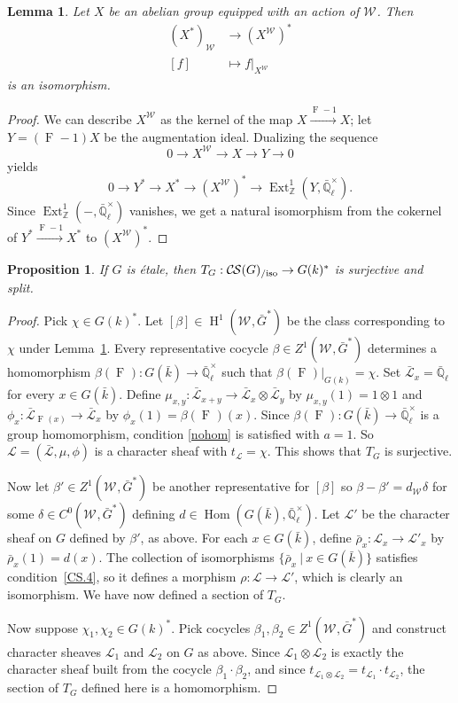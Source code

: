 \documentclass[10pt]{amsart}
\theoremstyle{plain}
\newtheorem{proposition}[theorem]{Proposition}
\newtheorem{lemma}[theorem]{Lemma}
\theoremstyle{definition}
\theoremstyle{remark}
\newcommand{\ZZ}{{\mathbb{Z}}}
\newcommand{\EE}{\mathbb{\bar Q}_\ell}
\newcommand{\bFq}{\bar{k}}
\newcommand{\Fq}{k}
\newcommand{\EEx}{\EE^\times}
\newcommand{\Weil}[1]{\mathcal{W}_{#1}}
\newcommand{\Frob}[1]{\operatorname{F}_{#1}}
\DeclareMathOperator{\Hom}{Hom}
\DeclareMathOperator{\Ext}{Ext}
\DeclareMathOperator{\Hh}{H}
\newcommand{\tq}{{\ \vert\ }}
\newcommand{\trFrob}[1]{t_{#1}}
\newcommand{\TrFrob}[1]{T_{#1}}
\newcommand{\cs}[1]{{\mathcal{#1}}}
\newcommand{\gcs}[1]{{\mathcal{\bar #1}}}
\newcommand{\CS}{{\mathcal{C\hskip-0.8pt S}}}
\newcommand{\CSiso}[1]{\CS(#1)_{/\text{iso}}}
\newcommand{\bG}{\bar{G}}
\newcommand{\brho}{{\bar\rho}}
\begin{document}
\begin{lemma} \label{lem:dual-inv}
Let $X$ be an abelian group equipped with an action of $\Weil{}$.  Then
\begin{align*}
 (X^*)_{\Weil{}} &\to (X^{\Weil{}})^* \\
 [f] &\mapsto f|_{X^{\Weil{}}}
\end{align*}
is an isomorphism.
\end{lemma}

\begin{proof}
We can describe $X^{\Weil{}}$ as the kernel of the map $X \xrightarrow{\Frob{}-1} X$;
let $Y = (\Frob{}-1)X$ be the augmentation ideal.  Dualizing the sequence
\[
 0 \to X^{\Weil{}} \to X \to Y \to 0
\]
yields
\[
 0 \to Y^* \to X^* \to (X^{\Weil{}})^* \to \Ext^1_\ZZ(Y, \EEx).
\]
Since $\Ext^1_\ZZ(-,\EEx)$ vanishes, we get a natural isomorphism from the cokernel of $Y^* \xrightarrow{\Frob{}-1} X^*$ to $(X^{\Weil{}})^*$.
\end{proof}

\begin{proposition}\label{prop:sur_etale}
If $G$ is \'etale, then $\TrFrob{G} : \CSiso{G} \to G(\Fq)^*$ is surjective
and split.
\end{proposition}
\begin{proof}
Pick $\chi \in G(\Fq)^*$. 
Let $[\beta]\in \Hh^1(\Weil{},\bG^*)$ be the class corresponding to $\chi$ under Lemma~\ref{lem:dual-inv}.
Every representative cocycle $\beta \in Z^1(\Weil{},\bG^*)$ determines a homomorphism $\beta(\Frob{}) : G(\bFq)\to \EEx$ such that $\beta(\Frob{})\vert_{G(\Fq)} = \chi$.
Set $\gcs{L}_x = \EE$ for every $x\in G(\bFq)$.
Define $\mu_{x,y} : \gcs{L}_{x+y} \to \gcs{L}_x\otimes \gcs{L}_y$ by $\mu_{x,y}(1) = 1 \otimes 1$ and
$\phi_{x} : \gcs{L}_{\Frob{}(x)} \to \gcs{L}_x$ by $\phi_{x}(1) = \beta(\Frob{})(x)$.
Since $\beta(\Frob{}) : G(\bFq) \to \EEx$ is a group homomorphism,
condition \eqref{nohom} is satisfied with $a =1$.
So $\cs{L} = (\gcs{L}, \mu, \phi)$
is a character sheaf with $\trFrob{\cs{L}} = \chi$.
This shows that $\TrFrob{G}$ is surjective.

Now let $\beta' \in Z^1(\Weil{},\bG^*)$ be another representative for $[\beta]$
so $\beta-\beta' = d_{\Weil{}} \delta$ for some $\delta \in C^0(\Weil{},\bG^*)$ defining $d \in \Hom(G(\bFq),\EEx)$.
Let $\cs{L}'$ be the character sheaf on $G$ defined by $\beta'$, as above.
For each $x\in G(\bFq)$, define $\brho_x :\cs{L}_x\to \cs{L}'_x$ by $\brho_x(1) = d(x)$.
The collection of isomorphisms $\{ \brho_x \tq x\in G(\bFq)\}$ satisfies condition~\ref{CS.4}, so it defines a morphism $\rho : \cs{L}\to \cs{L}'$, which is clearly an isomorphism. 
%
We have now defined a section of $\TrFrob{G}$. 

Now suppose $\chi_1, \chi_2 \in G(\Fq)^*$. Pick cocycles $\beta_1,\beta_2\in Z^1(\Weil{},\bG^*)$ and construct character sheaves $\cs{L}_1$ and $\cs{L}_2$ on $G$ as above. Since $\cs{L}_1\otimes \cs{L}_2$ is exactly the character sheaf built from the cocycle $\beta_1\cdot \beta_2$, and since $\trFrob{\cs{L}_1\otimes \cs{L}_2} = \trFrob{\cs{L}_1}\cdot \trFrob{\cs{L}_2}$, the section of $\TrFrob{G}$ defined here is a homomorphism.
\end{proof}
\end{document}
